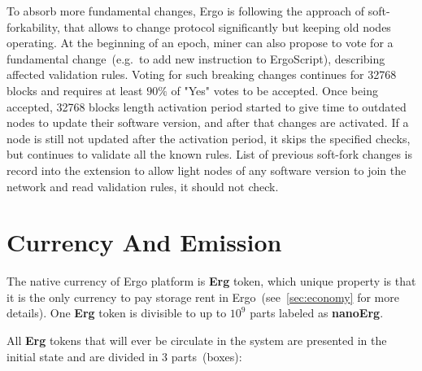 \documentclass[]{article}
\newcommand{\Ergo}{Ergo}
\newcommand{\Erg}{\textbf{Erg}}
\newcommand{\nanoErg}{\textbf{nanoErg}}
\begin{document}
    To absorb more fundamental changes, Ergo is following the approach of soft-forkability, that
    allows to change protocol significantly but keeping old nodes operating.
    At the beginning of an epoch, miner can also propose to vote for a fundamental change~(e.g.~to
    add new instruction to ErgoScript), describing affected validation rules.
    Voting for such breaking changes continues for 32768 blocks and requires at least $90\%$ of
    "Yes" votes to be accepted.
    Once being accepted, 32768 blocks length activation period started to give time to outdated
    nodes to update their software version, and after that changes are activated.
    If a node is still not updated after the activation period, it skips the specified checks,
    but continues to validate all the known rules.
    List of previous soft-fork changes is record into the extension to allow light nodes of
    any software version to join the network and read validation rules, it should not check.




    \section{Currency And Emission}
    \label{sec:currency}


    The native currency of \Ergo{} platform is \Erg{} token, which unique property is
    that it is the only currency to pay storage rent in \Ergo{}~(see~\ref{sec:economy} for more details).
    One \Erg{} token is divisible to up to $10^9$ parts labeled as \nanoErg{}.

    All \Erg{} tokens that will ever be circulate in the system are presented in the
    initial state and are divided in 3 parts~(boxes):
\end{document}
